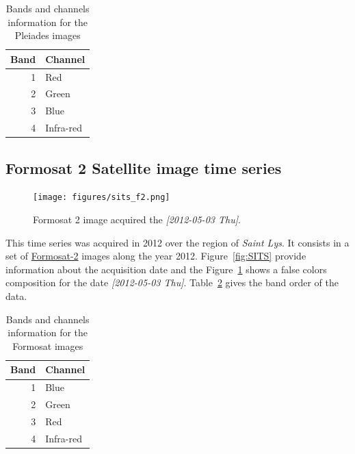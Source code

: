 \documentclass[a4paper,11pt,DIV=18]{scrartcl}
\begin{document}
\begin{table}[htbp]
\caption{\label{tab:org1b82d91}
Bands and channels information for the Pleiades images}
\centering
\begin{tabular}{rl}
\toprule
Band & Channel\\
\midrule
1 & Red\\
2 & Green\\
3 & Blue\\
4 & Infra-red\\
\bottomrule
\end{tabular}
\end{table}

\subsection{Formosat 2 Satellite image time series}
\label{sec:orgf29b71c}
\begin{figure}[htbp]
\centering
\texttt{[image: figures/sits\_f2.png]}
\caption{\label{fig:org4235163}
Formosat 2 image acquired the \textit{[2012-05-03 Thu]}.}
\end{figure}

This time series was acquired in 2012 over the region of \emph{Saint Lys}. It
consists  in  a  set  of   \href{http://www.satimagingcorp.com/satellite-sensors/other-satellite-sensors/formosat-2/}{Formosat-2}  images  along  the  year  2012.
Figure~\ref{fig:SITS} provide information  about the acquisition
date and the Figure~\ref{fig:org4235163} shows a false colors composition for
the  date \textit{[2012-05-03 Thu]}. Table~\ref{tab:org857b7c3}  gives the
band order of the data.

\begin{table}[htbp]
\caption{\label{tab:org857b7c3}
Bands and channels information for the Formosat images}
\centering
\begin{tabular}{rl}
\toprule
Band & Channel\\
\midrule
1 & Blue\\
2 & Green\\
3 & Red\\
4 & Infra-red\\
\bottomrule
\end{tabular}
\end{table}
\end{document}
